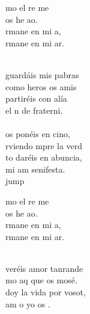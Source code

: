 \begin{cancion}[Amaos][Kairoi]%
	\begin{chorus}%
	mo el re me  \\
	 os he ao.\\
	rmane en mi a,\\
	rmane en mi ar.\\
	\end{chorus}%
	\jump\\
	guardáis mis pabras\\
	como heros os amis\\
	partiréis con alía\\
	el n de fraterni.\\
	\jump\\
	os ponéis en cino,\\
	rviendo mpre la verd\\
	to daréis en abuncia,\\
	mi am senifesta.\\jump\\
	\begin{chorus}%
	mo el re me  \\
	 os he ao.\\
	rmane en mi a,\\
	rmane en mi ar.\\
	\end{chorus}%
	\jump\\
	veréis amor tanrande\\
	mo aq que os mosé.\\
	doy la vida por vosot,\\
	am o yo os . \\

\end{cancion}
